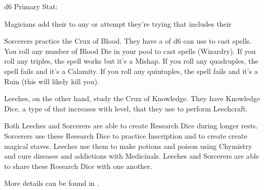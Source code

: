 {{{    }
  }



  \HD d6 \hfill Primary Stat: \INT
  



  Magicians add their \LVL to any \RO or \RB  attempt they're trying that includes their \INT

  \cbreak


  Sorcerers practice the Crux of Blood. They have a \POOL of d6 can use to cast spells.  You roll any number of Blood Die in your pool to cast spells (Wizardry). If you roll any triples, the spell works but it's a Mishap. If you roll any quadruples, the spell fails and it's a Calamity. If you roll any quintuples, the spell fails and it's a Ruin (this will likely kill you).

  Leeches, on the other hand, study the Crux of Knowledge.  They have Knowledge Dice, a type of \STATIC that increases with level, that they use to perform Leechcraft.

  Both Leeches and Sorcerers are able to create Research Dice during longer rests.  Sorcerers use these Research Dice to practice Inscription and to create create magical staves.  Leeches use them to make potions and poison using Chymistry and cure diseases and addictions with Medicinals.  Leeches and Sorcerers are able to share these Research Dice with one another.

  More details can be found in .

}
